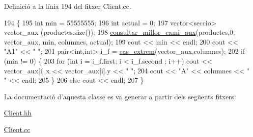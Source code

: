 Definició a la línia 194 del fitxer Client.\-cc.


\begin{DoxyCode}
194                                                     \{
195     \textcolor{keywordtype}{int} min = 55555555;
196     \textcolor{keywordtype}{int} actual = 0;
197     vector<seccio> vector\_aux (productes.size());
198     \hyperlink{_client_8cc_a46dcbde0b35706040fdc7644269132be}{consultar\_millor\_cami\_aux}(productes,0, vector\_aux, min, columnes, actual);
199     cout << min << endl;
200     cout << \textcolor{stringliteral}{"A1"} << \textcolor{stringliteral}{" "}; 
201     pair<int,int> i\_f = \hyperlink{_client_8cc_aa1c79131574379b4cd989a7ef172990d}{cas\_extrem}(vector\_aux,columnes);
202     \textcolor{keywordflow}{if} (min != 0) \{
203         \textcolor{keywordflow}{for} (\textcolor{keywordtype}{int} i = i\_f.first; i < i\_f.second ; i++) cout << vector\_aux[i].x << vector\_aux[i].y << \textcolor{stringliteral}{" "};
204         cout << \textcolor{stringliteral}{"A"} << columnes << \textcolor{stringliteral}{" "} << endl;
205     \}
206     \textcolor{keywordflow}{else} cout << endl;
207 \}
\end{DoxyCode}


La documentació d'aquesta classe es va generar a partir dels següents fitxers\-:\begin{DoxyCompactItemize}
\item 
\hyperlink{_client_8hh}{Client.\-hh}\item 
\hyperlink{_client_8cc}{Client.\-cc}\end{DoxyCompactItemize}
